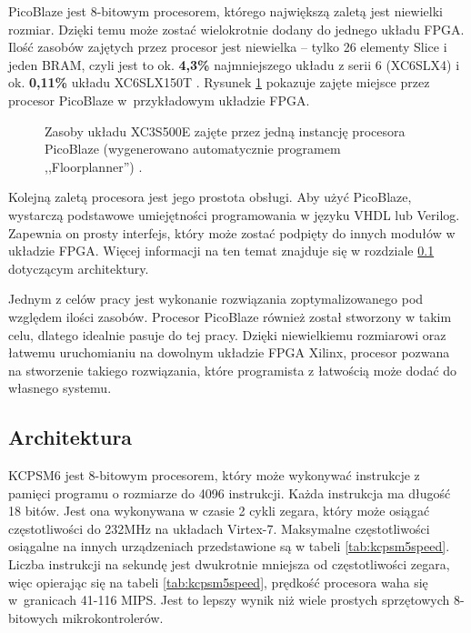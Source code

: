PicoBlaze jest 8-bitowym procesorem, którego największą zaletą jest niewielki rozmiar. Dzięki temu może zostać wielokrotnie dodany do jednego układu FPGA. Ilość zasobów zajętych przez procesor jest niewielka -- tylko 26 elementy Slice i jeden BRAM, czyli jest to ok. \textbf{4,3\%} najmniejszego układu z serii 6 (XC6SLX4) i ok. \textbf{0,11\%} układu XC6SLX150T \cite{kcpsm6}. Rysunek \ref{PicoBlazeSize} pokazuje zajęte miejsce przez procesor PicoBlaze w~przykładowym układzie FPGA.


\begin{figure}[htb]
	\centering
	\caption{Zasoby układu XC3S500E zajęte przez jedną instancję procesora PicoBlaze (wygenerowano automatycznie programem ,,Floorplanner'') \cite{kcpsm3_spi}. }
	\label{PicoBlazeSize}
\end{figure}


Kolejną zaletą procesora jest jego prostota obsługi. Aby użyć PicoBlaze, wystarczą podstawowe umiejętności programowania w języku VHDL lub Verilog. Zapewnia on prosty interfejs, który może zostać podpięty do innych modułów w układzie FPGA. Więcej informacji na ten temat znajduje się w rozdziale \ref{picoblaze_arch} dotyczącym architektury.


Jednym z celów pracy jest wykonanie rozwiązania zoptymalizowanego pod względem ilości zasobów. Procesor PicoBlaze również został stworzony w takim celu, dlatego idealnie pasuje do tej pracy. Dzięki niewielkiemu rozmiarowi oraz łatwemu uruchomianiu na dowolnym układzie FPGA Xilinx, procesor pozwana na stworzenie takiego rozwiązania, które programista z łatwością może dodać do własnego systemu.


\subsection{Architektura}
\label{picoblaze_arch}

KCPSM6 jest 8-bitowym procesorem, który może wykonywać instrukcje z pamięci programu o rozmiarze do 4096 instrukcji. Każda instrukcja ma długość 18 bitów. Jest ona wykonywana w czasie 2 cykli zegara, który może osiągać częstotliwości do 232MHz na układach Virtex-7. Maksymalne częstotliwości osiągalne na innych urządzeniach przedstawione są w tabeli \ref{tab:kcpsm5speed}. Liczba instrukcji na sekundę jest dwukrotnie mniejsza od częstotliwości zegara, więc opierając się na tabeli \ref{tab:kcpsm5speed}, prędkość procesora waha się w~granicach 41-116 MIPS. Jest to lepszy wynik niż wiele prostych sprzętowych 8-bitowych mikrokontrolerów.


